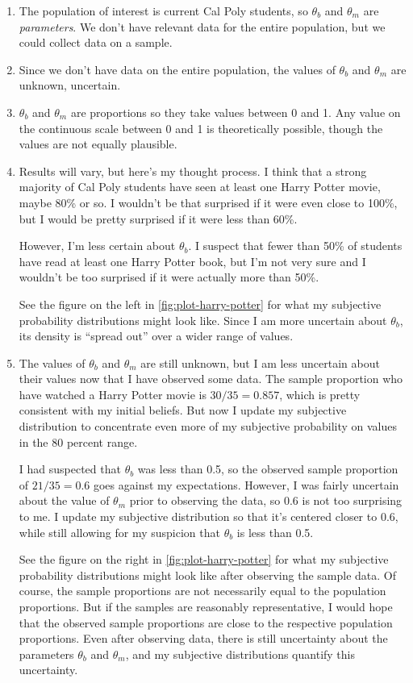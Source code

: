 \documentclass[
]{book}
\theoremstyle{definition}
\theoremstyle{definition}
\theoremstyle{definition}
\theoremstyle{remark}
\begin{document}
\begin{enumerate}
\def\labelenumi{\arabic{enumi}.}
\item
  The population of interest is current Cal Poly students, so \(\theta_b\) and \(\theta_m\) are \emph{parameters}. We don't have relevant data for the entire population, but we could collect data on a sample.
\item
  Since we don't have data on the entire population, the values of \(\theta_b\) and \(\theta_m\) are unknown, uncertain.
\item
  \(\theta_b\) and \(\theta_m\) are proportions so they take values between 0 and 1. Any value on the continuous scale between 0 and 1 is theoretically possible, though the values are not equally plausible.
\item
  Results will vary, but here's my thought process. I think that a strong majority of Cal Poly students have seen at least one Harry Potter movie, maybe 80\% or so. I wouldn't be that surprised if it were even close to 100\%, but I would be pretty surprised if it were less than 60\%.

  However, I'm less certain about \(\theta_b\). I suspect that fewer than 50\% of students have read at least one Harry Potter book, but I'm not very sure and I wouldn't be too surprised if it were actually more than 50\%.

  See the figure on the left in \ref{fig:plot-harry-potter} for what my subjective probability distributions might look like. Since I am more uncertain about \(\theta_b\), its density is ``spread out'' over a wider range of values.
\item
  The values of \(\theta_b\) and \(\theta_m\) are still unknown, but I am less uncertain about their values now that I have observed some data. The sample proportion who have watched a Harry Potter movie is \(30/35 = 0.857\), which is pretty consistent with my initial beliefs. But now I update my subjective distribution to concentrate even more of my subjective probability on values in the 80 percent range.

  I had suspected that \(\theta_b\) was less than 0.5, so the observed sample proportion of \(21/35 = 0.6\) goes against my expectations. However, I was fairly uncertain about the value of \(\theta_m\) prior to observing the data, so 0.6 is not too surprising to me. I update my subjective distribution so that it's centered closer to 0.6, while still allowing for my suspicion that \(\theta_b\) is less than 0.5.

  See the figure on the right in \ref{fig:plot-harry-potter} for what my subjective probability distributions might look like after observing the sample data. Of course, the sample proportions are not necessarily equal to the population proportions. But if the samples are reasonably representative, I would hope that the observed sample proportions are close to the respective population proportions. Even after observing data, there is still uncertainty about the parameters \(\theta_b\) and \(\theta_m\), and my subjective distributions quantify this uncertainty.
\end{enumerate}
\end{document}
